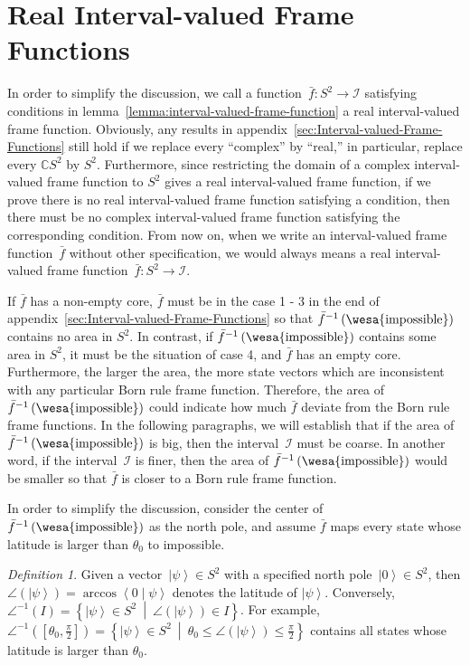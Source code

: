 \documentclass{article}
\theoremstyle{remark}
\newtheorem{definition}{Definition}
\newcommand{\imposs}{{\mbox{\wesa{impossible}}}}
\newcommand{\ket}[1]{{\left\vert{#1}\right\rangle}}
\newcommand{\ip}[2]{\ensuremath{\left\langle{#1}\middle\vert{#2}\right\rangle}}
\newcommand{\set}[2]{\ensuremath{\left\{ {#1}~\middle|~{#2}\right\} }}
\begin{document}
\section{Real Interval-valued Frame Functions}

In order to simplify the discussion, we call a function~$\bar{f}:S^{2}\rightarrow\mathscr{I}$
satisfying conditions in lemma~\ref{lemma:interval-valued-frame-function}
a real interval-valued frame function. Obviously, any results in appendix~\ref{sec:Interval-valued-Frame-Functions}
still hold if we replace every ``complex'' by ``real,'' in particular,
replace every $\mathbb{C}S^{2}$ by $S^{2}$. Furthermore, since restricting
the domain of a complex interval-valued frame function to $S^{2}$
gives a real interval-valued frame function, if we prove there is
no real interval-valued frame function satisfying a condition, then
there must be no complex interval-valued frame function satisfying
the corresponding condition. From now on, when we write an interval-valued
frame function~$\bar{f}$ without other specification, we would always
means a real interval-valued frame function~$\bar{f}:S^{2}\rightarrow\mathscr{I}$.

If $\bar{f}$ has a non-empty core, $\bar{f}$ must be in the case
1 - 3 in the end of appendix~\ref{sec:Interval-valued-Frame-Functions}
so that $\bar{f}^{-1}\left(\imposs\right)$ contains no area in $S^{2}$.
In contrast, if $\bar{f}^{-1}\left(\imposs\right)$ contains some
area in $S^{2}$, it must be the situation of case 4, and $\bar{f}$
has an empty core. Furthermore, the larger the area, the more state
vectors which are inconsistent with any particular Born rule frame
function. Therefore, the area of $\bar{f}^{-1}\left(\imposs\right)$
could indicate how much $\bar{f}$ deviate from the Born rule frame
functions. In the following paragraphs, we will establish that if
the area of $\bar{f}^{-1}\left(\imposs\right)$ is big, then the interval~$\mathscr{I}$
must be coarse. In another word, if the interval~$\mathscr{I}$ is
finer, then the area of $\bar{f}^{-1}\left(\imposs\right)$ would
be smaller so that $\bar{f}$ is closer to a Born rule frame function.

In order to simplify the discussion, consider the center of $\bar{f}^{-1}\left(\imposs\right)$
as the north pole, and assume $\bar{f}$ maps every state whose latitude
is larger than $\theta_{0}$ to impossible.

\begin{definition}Given a vector~$\ket{\psi}\in S^{2}$ with a specified
north pole~$\ket{0}\in S^{2}$, then $\angle\left(\ket{\psi}\right)=\arccos\ip{0}{\psi}$
denotes the latitude of $\ket{\psi}$. Conversely, $\angle^{-1}\left(I\right)=\set{\ket{\psi}\in S^{2}}{\angle\left(\ket{\psi}\right)\in I}$.
For example, $\angle^{-1}\left(\left[\theta_{0},\frac{\pi}{2}\right]\right)=\set{\ket{\psi}\in S^{2}}{\theta_{0}\le\angle\left(\ket{\psi}\right)\le\frac{\pi}{2}}$
contains all states whose latitude is larger than $\theta_{0}$.\end{definition}
\end{document}

